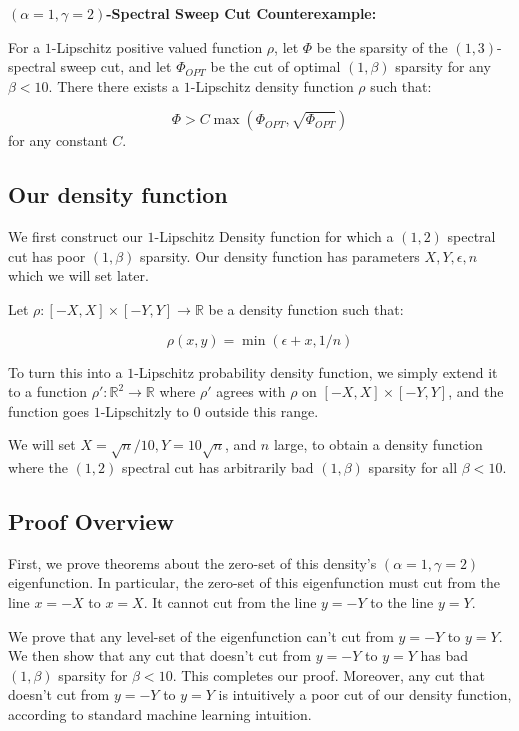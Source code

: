 
\begin{theorem}\label{thm:counterexample} \textbf{$(\alpha=1,\gamma=2)$-Spectral Sweep Cut Counterexample:}

  For a $1$-Lipschitz positive valued function $\rho$, let $\Phi$ be the
  sparsity of the $(1,3)$-spectral sweep cut, and let $\Phi_{OPT}$ be
  the cut of optimal $(1, \beta)$ sparsity for any $\beta < 10$. There
  there exists a $1$-Lipschitz density function $\rho$ such that:

  \[\Phi > C \max(\Phi_{OPT}, \sqrt{\Phi_{OPT}})\]
  for any constant $C$.
\end{theorem}

\subsection{Our density function}
We first construct our $1$-Lipschitz Density function for which a
$(1,2)$ spectral cut has poor $(1,\beta)$ sparsity. Our density function
has parameters $X, Y, \epsilon, n$ which we will set later.

\begin{definition} Let $\rho: [-X, X] \times [-Y, Y] \rightarrow \mathbb{R}$ be a density function such that:

  \[ \rho(x, y) = \min(\epsilon + x, 1/n) \] 
\end{definition}
To turn this into a $1$-Lipschitz probability density function, we simply
extend it to a function $\rho':\mathbb{R}^2 \rightarrow \mathbb{R}$
where $\rho'$ agrees with $\rho$ on $[-X, X] \times [-Y, Y]$, and the
function goes $1$-Lipschitzly to $0$ outside this range.

We will set $X = \sqrt{n}/10, Y = 10\sqrt{n}$, and $n$ large, to obtain
a density function where the $(1, 2)$ spectral cut has arbitrarily bad
$(1,\beta)$ sparsity for all $\beta < 10$. 

\subsection{Proof Overview}

First, we prove theorems about the zero-set of this density's
$(\alpha=1,\gamma=2)$ eigenfunction. In particular, the zero-set of this
eigenfunction must cut from the line $x=-X$ to $x=X$. It cannot cut from
the line $y = -Y$ to the line $y = Y$.

We prove that any level-set of the eigenfunction can't cut from $y
= -Y$ to $y = Y$. We then show that any cut that doesn't cut from $y =
-Y$ to $y = Y$ has bad $(1,\beta)$ sparsity for $\beta < 10$. This
completes our proof. Moreover, any cut that doesn't cut from $y=-Y$ to
$y=Y$ is intuitively a poor cut of our density function, according to
standard machine learning intuition.

